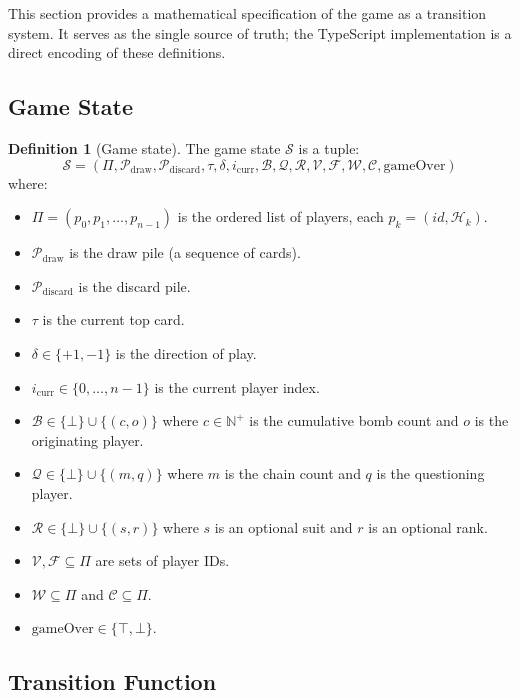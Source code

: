 \documentclass[11pt,a4paper,twoside]{article}
\theoremstyle{definition}
\newtheorem{definition}{Definition}[section]
\theoremstyle{remark}
\newcommand{\Hand}{\ensuremath{\mathcal{H}}}
\newcommand{\Pile}{\ensuremath{\mathcal{P}}}
\newcommand{\State}{\ensuremath{\mathcal{S}}}
\newcommand{\Top}{\ensuremath{\tau}}
\newcommand{\Dir}{\ensuremath{\delta}}
\newcommand{\Players}{\ensuremath{\Pi}}
\newcommand{\Winner}{\ensuremath{\mathcal{W}}}
\newcommand{\Cardless}{\ensuremath{\mathcal{C}}}
\newcommand{\Bomb}{\ensuremath{\mathcal{B}}}
\newcommand{\Quest}{\ensuremath{\mathcal{Q}}}
\newcommand{\OnVerge}{\ensuremath{\mathcal{V}}}
\newcommand{\Failed}{\ensuremath{\mathcal{F}}}
\newcommand{\CardReq}{\ensuremath{\mathcal{R}}}
\begin{document}
This section provides a mathematical specification of the game as a transition
system. It serves as the single source of truth; the TypeScript implementation
is a direct encoding of these definitions.

\subsection{Game State}

\begin{definition}[Game state]
  The game state $\State$ is a tuple:
  \[
  \State = (\Players, \Pile_{\text{draw}}, \Pile_{\text{discard}}, \Top, \Dir, i_{\text{curr}},
            \Bomb, \Quest, \CardReq, \OnVerge, \Failed, \Winner, \Cardless,
            \text{gameOver})
  \]
  where:
  \begin{itemize}[nosep]
    \item $\Players = (p_0, p_1, \dots, p_{n-1})$ is the ordered list of
          players, each $p_k = (id, \Hand_k)$.
    \item $\Pile_{\text{draw}}$ is the draw pile (a sequence of cards).
    \item $\Pile_{\text{discard}}$ is the discard pile.
    \item $\Top$ is the current top card.
    \item $\Dir \in \{+1, -1\}$ is the direction of play.
    \item $i_{\text{curr}} \in \{0, \dots, n-1\}$ is the current player index.
    \item $\Bomb \in \{\bot\} \cup \{(c, o)\}$ where $c \in \mathbb{N}^+$ is
          the cumulative bomb count and $o$ is the originating player.
    \item $\Quest \in \{\bot\} \cup \{(m, q)\}$ where $m$ is the chain count
          and $q$ is the questioning player.
    \item $\CardReq \in \{\bot\} \cup \{(s, r)\}$ where $s$ is an optional
          suit and $r$ is an optional rank.
    \item $\OnVerge, \Failed \subseteq \Players$ are sets of player IDs.
    \item $\Winner \subseteq \Players$ and $\Cardless \subseteq \Players$.
    \item $\text{gameOver} \in \{\top, \bot\}$.
  \end{itemize}
\end{definition}

\subsection{Transition Function}
\end{document}
